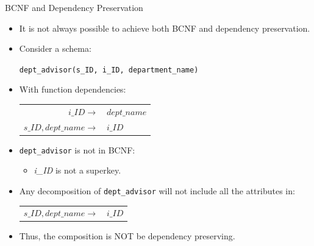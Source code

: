 \documentclass{beamer}
\begin{document}
\begin{frame}{BCNF and Dependency Preservation}
    \begin{itemize}
        \item It is not always possible to achieve both BCNF and dependency preservation.
        \item Consider a schema:
            \begin{center}
                \texttt{dept\_advisor(s\_ID, i\_ID, department\_name)}
            \end{center}
        \item With function dependencies:\\
            \begin{tabular}{r l}
                $i\_ID \rightarrow$ & $dept\_name$ \\
                $s\_ID, dept\_name \rightarrow$ & $i\_ID$
            \end{tabular}
        \item \texttt{dept\_advisor} is not in BCNF:
            \begin{itemize}
                \item \textit{i\_ID} is not a superkey.
            \end{itemize}
        \item Any decomposition of \texttt{dept\_advisor} will not include all the attributes in: \\
            \begin{tabular}{r l}
                $s\_ID, dept\_name \rightarrow$ & $i\_ID$
            \end{tabular}
        \item Thus, the composition is NOT be dependency preserving.
    \end{itemize}
\end{frame}
\end{document}
